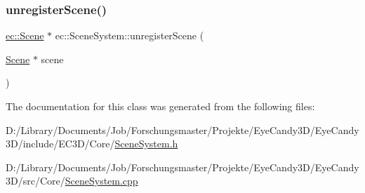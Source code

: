 \mbox{\label{classec_1_1_scene_system_ae00450951bc3220dd9899d75bdd207c4}} 
\subsubsection{\texorpdfstring{unregister\+Scene()}{unregisterScene()}}
{\footnotesize\ttfamily \mbox{\hyperlink{classec_1_1_scene}{ec\+::\+Scene}} $\ast$ ec\+::\+Scene\+System\+::unregister\+Scene (\begin{DoxyParamCaption}\item[{\mbox{\hyperlink{classec_1_1_scene}{Scene}} $\ast$}]{scene }\end{DoxyParamCaption})}



The documentation for this class was generated from the following files\+:\begin{DoxyCompactItemize}
\item 
D\+:/\+Library/\+Documents/\+Job/\+Forschungsmaster/\+Projekte/\+Eye\+Candy3\+D/\+Eye\+Candy3\+D/include/\+E\+C3\+D/\+Core/\mbox{\hyperlink{_scene_system_8h}{Scene\+System.\+h}}\item 
D\+:/\+Library/\+Documents/\+Job/\+Forschungsmaster/\+Projekte/\+Eye\+Candy3\+D/\+Eye\+Candy3\+D/src/\+Core/\mbox{\hyperlink{_scene_system_8cpp}{Scene\+System.\+cpp}}\end{DoxyCompactItemize}
